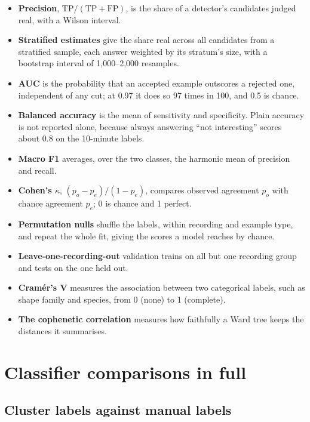 \begin{itemize}
  \item \textbf{Precision}, $\mathrm{TP}/(\mathrm{TP}+\mathrm{FP})$, is the share of a detector's candidates judged real, with a Wilson interval.
  \item \textbf{Stratified estimates} give the share real across all candidates from a stratified sample, each answer weighted by its stratum's size, with a bootstrap interval \cite{efron1979bootstrap} of 1,000--2,000 resamples.
  \item \textbf{AUC} is the probability that an accepted example outscores a rejected one, independent of any cut; at 0.97 it does so 97 times in 100, and 0.5 is chance.
  \item \textbf{Balanced accuracy} is the mean of sensitivity and specificity. Plain accuracy is not reported alone, because always answering ``not interesting'' scores about 0.8 on the 10-minute labels.
  \item \textbf{Macro F1} averages, over the two classes, the harmonic mean of precision and recall.
  \item \textbf{Cohen's $\kappa$}, $(p_o-p_e)/(1-p_e)$, compares observed agreement $p_o$ with chance agreement $p_e$; 0 is chance and 1 perfect.
  \item \textbf{Permutation nulls} shuffle the labels, within recording and example type, and repeat the whole fit, giving the scores a model reaches by chance.
  \item \textbf{Leave-one-recording-out} validation trains on all but one recording group and tests on the one held out.
  \item \textbf{Cramér's V} \cite{cramer1946} measures the association between two categorical labels, such as shape family and species, from 0 (none) to 1 (complete).
  \item \textbf{The cophenetic correlation} \cite{sokal1962cophenetic} measures how faithfully a Ward tree \cite{ward1963} keeps the distances it summarises.
\end{itemize}

\section{Classifier comparisons in full}
\label{app:ch8detail}

\subsection{Cluster labels against manual labels}

